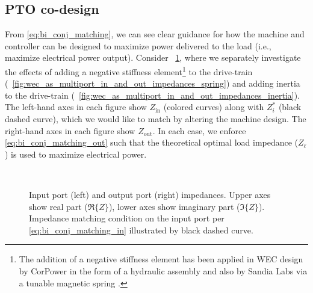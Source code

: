 \documentclass[5p,times]{elsarticle}
\begin{document}
\subsection{PTO co-design}\label{sec:pto_codesign}
From \eqref{eq:bi_conj_matching}, we can see clear guidance for how the machine and controller can be designed to maximize power delivered to the load (i.e., maximize electrical power output).
Consider \figurename~\ref{fig:wec_as_multiport_in_and_out_impedances}, where we separately investigate the effects of adding a negative stiffness element\footnote{The addition of a negative stiffness element has been applied in WEC design by CorPower in the form of a hydraulic assembly \cite{Todalshaug:2016aa} and also by Sandia Labs via a tunable magnetic spring \cite{Forbush:2024aa}.} to the drive-train (\figurename~\ref{fig:wec_as_multiport_in_and_out_impedances_spring}) and adding inertia to the drive-train (\figurename~\ref{fig:wec_as_multiport_in_and_out_impedances_inertia}).
The left-hand axes in each figure show $Z_{\textrm{in}}$ (colored curves) along with $Z_i^*$ (black dashed curve), which we would like to match by altering the machine design.
The right-hand axes in each figure show $Z_{\textrm{out}}$.
In each case, we enforce \eqref{eq:bi_conj_matching_out} such that the theoretical optimal load impedance ($Z_\ell$) is used to maximize electrical power.

\begin{figure}[tb]
        \\
        \caption{Input port (left) and output port (right) impedances. Upper axes show real part ($\Re \{ Z \}$), lower axes show imaginary part ($\Im \{ Z \}$). Impedance matching condition on the input port per \eqref{eq:bi_conj_matching_in} illustrated by black dashed curve.}
        \label{fig:wec_as_multiport_in_and_out_impedances}
\end{figure}
\end{document}
